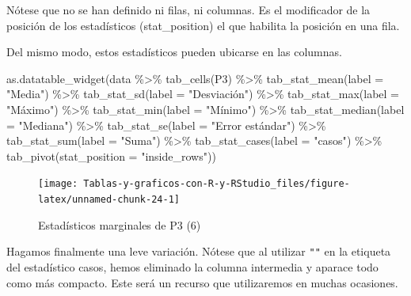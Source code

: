 \documentclass[
]{book}
\newenvironment{Shaded}{\begin{snugshade}}{\end{snugshade}}
\newcommand{\AttributeTok}[1]{\textcolor[rgb]{0.77,0.63,0.00}{#1}}
\newcommand{\FunctionTok}[1]{\textcolor[rgb]{0.00,0.00,0.00}{#1}}
\newcommand{\NormalTok}[1]{#1}
\newcommand{\SpecialCharTok}[1]{\textcolor[rgb]{0.00,0.00,0.00}{#1}}
\newcommand{\StringTok}[1]{\textcolor[rgb]{0.31,0.60,0.02}{#1}}
\begin{document}
Nótese que no se han definido ni filas, ni columnas. Es el modificador de la posición de los estadísticos (stat\_position) el que habilita la posición en una fila.

Del mismo modo, estos estadísticos pueden ubicarse en las columnas.

\begin{Shaded}
\begin{Highlighting}[]
\FunctionTok{as.datatable\_widget}\NormalTok{(data }\SpecialCharTok{\%\textgreater{}\%}
  \FunctionTok{tab\_cells}\NormalTok{(P3) }\SpecialCharTok{\%\textgreater{}\%}
  \FunctionTok{tab\_stat\_mean}\NormalTok{(}\AttributeTok{label =} \StringTok{"Media"}\NormalTok{) }\SpecialCharTok{\%\textgreater{}\%}
  \FunctionTok{tab\_stat\_sd}\NormalTok{(}\AttributeTok{label =} \StringTok{"Desviación"}\NormalTok{) }\SpecialCharTok{\%\textgreater{}\%}
  \FunctionTok{tab\_stat\_max}\NormalTok{(}\AttributeTok{label =} \StringTok{"Máximo"}\NormalTok{) }\SpecialCharTok{\%\textgreater{}\%}
  \FunctionTok{tab\_stat\_min}\NormalTok{(}\AttributeTok{label =} \StringTok{"Mínimo"}\NormalTok{) }\SpecialCharTok{\%\textgreater{}\%}
  \FunctionTok{tab\_stat\_median}\NormalTok{(}\AttributeTok{label =} \StringTok{"Mediana"}\NormalTok{) }\SpecialCharTok{\%\textgreater{}\%}
  \FunctionTok{tab\_stat\_se}\NormalTok{(}\AttributeTok{label =} \StringTok{"Error estándar"}\NormalTok{) }\SpecialCharTok{\%\textgreater{}\%}
  \FunctionTok{tab\_stat\_sum}\NormalTok{(}\AttributeTok{label =} \StringTok{"Suma"}\NormalTok{) }\SpecialCharTok{\%\textgreater{}\%}
  \FunctionTok{tab\_stat\_cases}\NormalTok{(}\AttributeTok{label =} \StringTok{"casos"}\NormalTok{) }\SpecialCharTok{\%\textgreater{}\%}
  \FunctionTok{tab\_pivot}\NormalTok{(}\AttributeTok{stat\_position =} \StringTok{"inside\_rows"}\NormalTok{))}
\end{Highlighting}
\end{Shaded}

\begin{figure}[H]

{\centering \texttt{[image: Tablas-y-graficos-con-R-y-RStudio\_files/figure-latex/unnamed-chunk-24-1]} 

}

\caption{Estadísticos marginales de P3 (6)}\label{fig:unnamed-chunk-24}
\end{figure}

Hagamos finalmente una leve variación. Nótese que al utilizar \texttt{"\textbar{}"} en la etiqueta del estadístico casos, hemos eliminado la columna intermedia y aparace todo como más compacto. Este será un recurso que utilizaremos en muchas ocasiones.
\end{document}
